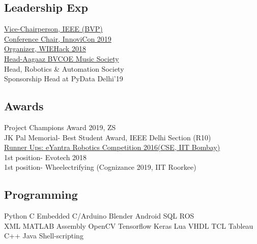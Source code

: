 \documentclass[]{deedy-resume-openfont}
\begin{document}
\begin{minipage}[t]{0.33\textwidth}

\hline
\sectionsep
\subsection{Leadership Exp}
\textbullet{}
\href{http:bvpieeend.com}{Vice-Chairperson, IEEE (BVP)}\\
\textbullet{}
\href{http://innovicon.bvpieeend.com}{Conference Chair, InnoviCon 2019}\\
\textbullet{}
\href{https://site.ieee.org/sb-bvcoend/wiehack/}{Organizer, WIEHack 2018}\\
\textbullet{}
\href{https://www.facebook.com/aagaaz.bvcoe}{Head-Aagaaz BVCOE Music Society}\\
\textbullet{}
Head, Robotics \& Automation Society\\
\textbullet{}
Sponsorship Head at PyData Delhi'19
\sectionsep
\hline
\sectionsep


\subsection{Awards}
\textbullet{}Project Champions Award 2019, ZS\\
\textbullet{}JK Pal Memorial- Best Student Award, IEEE Delhi Section (R10)\\
\textbullet{}\href{https://www.youtube.com/watch?v=klHIkianCT4}{Runner Ups: eYantra Robotics Competition 2016(CSE, IIT Bombay)}\\
\textbullet{}1st position- Evotech 2018\\
\textbullet{}1st position- Wheelectrifying (Cognizance 2019, IIT Roorkee) \\
\sectionsep
\hline
\sectionsep


\subsection{Programming}
\textbullet{}Python \textbullet{}C \textbullet{}Embedded C/Arduino \textbullet{}Blender \textbullet{}Android \textbullet{}SQL \textbullet{}ROS \\ 
  \textbullet{}XML \textbullet{}MATLAB \textbullet{}Assembly \textbullet{}OpenCV \textbullet{}Tensorflow \textbullet{}Keras \textbullet{}Lua \textbullet{}VHDL \textbullet{}TCL \textbullet{}Tableau\\
\textbullet{}C++ \textbullet{}Java \textbullet{}Shell-scripting
\vspace{0.05in}
%
%

\end{minipage} 
\end{document}

